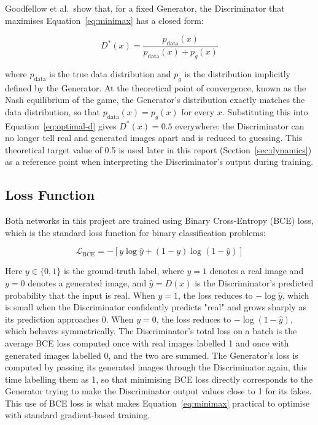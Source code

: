 \documentclass[12pt,a4paper]{article}
\begin{document}
Goodfellow et al.\ show that, for a fixed Generator, the Discriminator that maximises
Equation~\ref{eq:minimax} has a closed form:

\begin{equation}
    D^*(x) = \frac{p_{\text{data}}(x)}{p_{\text{data}}(x) + p_g(x)}
    \label{eq:optimal-d}
\end{equation}

where $p_{\text{data}}$ is the true data distribution and $p_g$ is the distribution
implicitly defined by the Generator. At the theoretical point of convergence, known as
the Nash equilibrium of the game, the Generator's distribution exactly matches the data
distribution, so that $p_{\text{data}}(x) = p_g(x)$ for every $x$. Substituting this into
Equation~\ref{eq:optimal-d} gives $D^*(x) = 0.5$ everywhere: the Discriminator can no
longer tell real and generated images apart and is reduced to guessing. This theoretical
target value of 0.5 is used later in this report (Section~\ref{sec:dynamics}) as a
reference point when interpreting the Discriminator's output during training.

\subsection{Loss Function}

Both networks in this project are trained using Binary Cross-Entropy (BCE) loss, which is
the standard loss function for binary classification problems:

\begin{equation}
    \mathcal{L}_{\text{BCE}} = -\left[ y \log \hat{y} + (1 - y) \log(1 - \hat{y}) \right]
    \label{eq:bce}
\end{equation}

Here $y \in \{0, 1\}$ is the ground-truth label, where $y=1$ denotes a real image and
$y=0$ denotes a generated image, and $\hat{y} = D(x)$ is the Discriminator's predicted
probability that the input is real. When $y=1$, the loss reduces to $-\log \hat{y}$,
which is small when the Discriminator confidently predicts "real" and grows sharply as
its prediction approaches 0. When $y=0$, the loss reduces to $-\log(1-\hat{y})$, which
behaves symmetrically. The Discriminator's total loss on a batch is the average BCE loss
computed once with real images labelled 1 and once with generated images labelled 0, and
the two are summed. The Generator's loss is computed by passing its generated images
through the Discriminator again, this time labelling them as 1, so that minimising BCE
loss directly corresponds to the Generator trying to make the Discriminator output values
close to 1 for its fakes. This use of BCE loss is what makes Equation~\ref{eq:minimax}
practical to optimise with standard gradient-based training.
\end{document}
